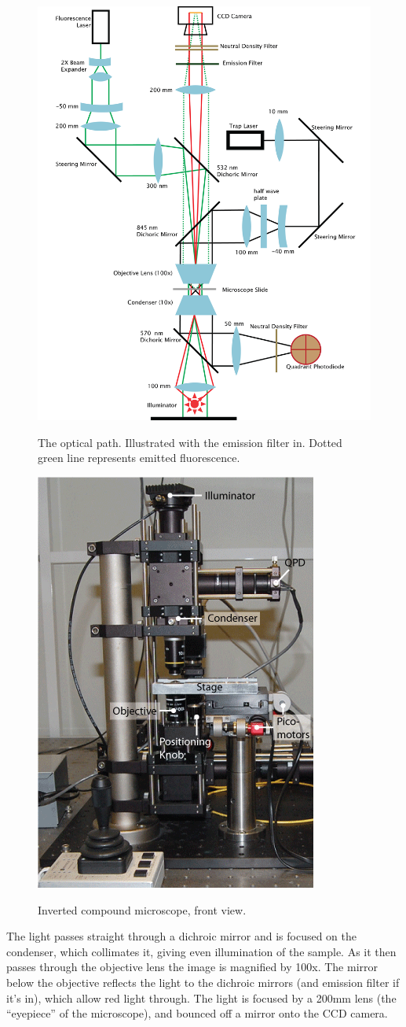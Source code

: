 \documentclass{../lab}
\begin{document}
\begin{figure}[h]
    \centering
    \href{http://experimentationlab.berkeley.edu/sites/default/files/OTZ/opticalPath.png}{\includegraphics[width=0.5\linewidth]{images/opticalPath.png}}
    \caption{The optical path. Illustrated with the emission filter in. Dotted green line represents emitted fluorescence.}
    \label{fig:400px-Graphic1}
\end{figure}

\begin{figure}[h]
    \centering
    \href{http://experimentationlab.berkeley.edu/sites/default/files/images/OTZ_From_Front.gif}{\includegraphics[width=0.5\linewidth]{images/OTZ_From_Front.png}}
    \caption{Inverted compound microscope, front view.}
    \label{fig:OTZ_From_Front}
\end{figure}

The light passes straight through a dichroic mirror and is focused on the condenser, which collimates it, giving even illumination of the sample. As it then passes through the objective lens the image is magnified by 100x. The mirror below the objective reflects the light to the dichroic mirrors (and emission filter if it's in), which allow red light through. The light is focused by a 200mm lens (the ``eyepiece'' of the microscope), and bounced off a mirror onto the CCD camera.
\end{document}
